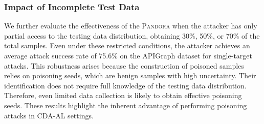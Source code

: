 \documentclass[lettersize,journal]{IEEEtran}
\newcommand{\pandora}{{\scshape Pandora}\xspace}
\begin{document}
\subsubsection{Impact of Incomplete Test Data}
\label{Impact of Incomplete Test Data}
We further evaluate the effectiveness of the \pandora when the attacker has only partial access to the testing data distribution, obtaining 30\%, 50\%, or 70\% of the total samples.
Even under these restricted conditions, the attacker achieves an average attack success rate of 75.6\% on the APIGraph dataset for single-target attacks.
This robustness arises because the construction of poisoned samples relies on poisoning seeds, which are benign samples with high uncertainty.
Their identification does not require full knowledge of the testing data distribution.
Therefore, even limited data collection is likely to obtain effective poisoning seeds.
These results highlight the inherent advantage of performing poisoning attacks in CDA-AL settings.
\end{document}
